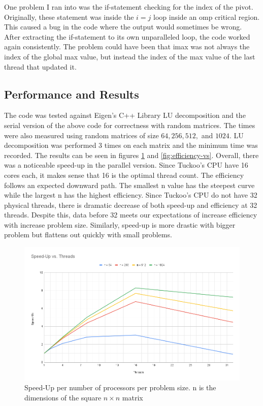 \documentclass[12pt,letterpaper]{article}
\begin{document}
One problem I ran into was the if-statement checking for the index of the pivot. Originally, these statement was inside the \(i=j\) loop inside an omp critical region. This caused a bug in the code where the output would sometimes be wrong. After extracting the if-statement to its own unparalleled loop, the code worked again consistently. The problem could have been that imax was not always the index of the global max value, but instead the index of the max value of the last thread that updated it.

\subsection{Performance and Results}
The code was tested against Eigen's C++ Library LU decomposition and the serial version of the above code for correctness with random matrices. The times were also measured using random matrices of size \(64, 256, 512,\) and \(1024\). LU decomposition was performed 3 times on each matrix and the minimum time was recorded. The results can be seen in figures \ref{fig:speed-up-vs} and \ref{fig:efficiency-vs}. Overall, there was a noticeable speed-up in the parallel version. Since Tuckoo's CPU have 16 cores each, it makes sense that 16 is the optimal thread count. The efficiency follows an expected downward path. The smallest n value has the steepest curve while the largest n has the highest efficiency. Since Tuckoo's CPU do not have 32 physical threads, there is dramatic decrease of both speed-up and efficiency at 32 threads. Despite this, data before 32 meets our expectations of increase efficiency with increase problem size. Similarly, speed-up is more drastic with bigger problem but flattens out quickly with small problems.

\begin{figure}[H]
    \centering
    \includegraphics[width=0.9\linewidth]{"Speed-Up vs. Threads"}
    \caption{Speed-Up per number of processors per problem size. n is the dimensions of the square \(n \times n\) matrix}
    \label{fig:speed-up-vs}
\end{figure}
\end{document}
